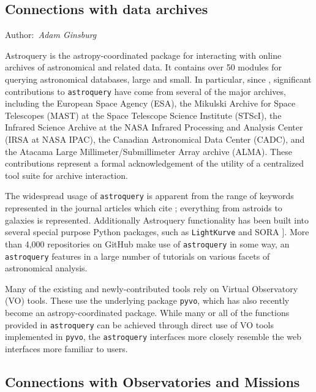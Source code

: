\documentclass[modern]{aastex631}
\newcommand{\paperii}{\cite{astropy:2018}}
\newcommand{\secauthor}[1]{{\color{blue}Author:~\textit{#1}}}
\begin{document}
\subsection{Connections with data archives}

\label{sec:astroquery}

\secauthor{Adam Ginsburg}

Astroquery \cite{Ginsburg2019} is the astropy-coordinated package for interacting with online archives of astronomical and related data. It contains over 50 modules for querying astronomical databases, large and small. In particular, since \paperii, significant contributions to \texttt{astroquery} have come from several of the major archives, including the European Space Agency (ESA), the Mikulski Archive for Space Telescopes (MAST) at the Space Telescope Science Institute (STScI), the Infrared Science Archive at the NASA Infrared Processing and Analysis Center (IRSA at NASA IPAC), the Canadian Astronomical Data Center (CADC), and the Atacama Large Millimeter/Submillimeter Array archive (ALMA). These contributions represent a formal acknowledgement of the utility of a centralized tool suite for archive interaction.

The widespread usage of \texttt{astroquery} is apparent from the range of keywords represented in the journal articles which cite \cite{Ginsburg2019}; everything from astroids to galaxies is represented. Additionally Astroquery functionality has been built into several special purpose Python packages, such as \texttt{LightKurve} \cite{LightKurve} and SORA \cite{SORA}]. More than 4,000 repositories on GitHub make use of \texttt{astroquery} in some way, an \texttt{astroquery} features in a large number of tutorials on various facets of astronomical analysis.

Many of the existing and newly-contributed tools rely on Virtual Observatory (VO) tools.
These use the underlying package \texttt{pyvo}, which has also recently become an astropy-coordinated package. While many or all of the functions provided in \texttt{astroquery} can be achieved through direct use of VO tools implemented in \texttt{pyvo}, the \texttt{astroquery} interfaces more closely resemble the web interfaces more familiar to users.

\subsection{Connections with Observatories and Missions}
\end{document}
